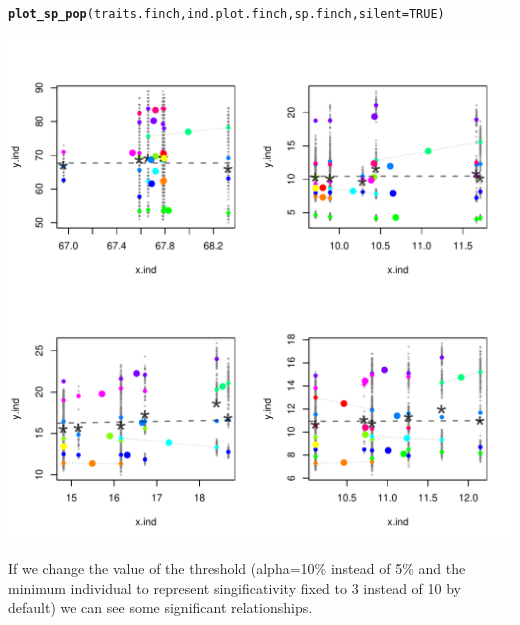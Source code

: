 \documentclass[12pt]{article}\usepackage[]{graphicx}\usepackage[]{color}
\makeatletter
\def\maxwidth{ %
  \ifdim\Gin@nat@width>\linewidth
    \linewidth
  \else
    \Gin@nat@width
  \fi
}
\newcommand{\hlnum}[1]{\textcolor[rgb]{0.686,0.059,0.569}{#1}}%
\newcommand{\hlstd}[1]{\textcolor[rgb]{0.345,0.345,0.345}{#1}}%
\newcommand{\hlkwc}[1]{\textcolor[rgb]{0.333,0.667,0.333}{#1}}%
\newcommand{\hlkwd}[1]{\textcolor[rgb]{0.737,0.353,0.396}{\textbf{#1}}}%
\newenvironment{kframe}{%
 \def\at@end@of@kframe{}%
 \ifinner\ifhmode%
  \def\at@end@of@kframe{\end{minipage}}%
  \begin{minipage}{\columnwidth}%
 \fi\fi%
 \def\FrameCommand##1{\hskip\@totalleftmargin \hskip-\fboxsep
 \colorbox{shadecolor}{##1}\hskip-\fboxsep
     \hskip-\linewidth \hskip-\@totalleftmargin \hskip\columnwidth}%
 \MakeFramed {\advance\hsize-\width
   \@totalleftmargin\z@ \linewidth\hsize
   \@setminipage}}%
 {\par\unskip\endMakeFramed%
 \at@end@of@kframe}
\newenvironment{knitrout}{}{} %
\makeatother
\begin{document}
\begin{knitrout}
\color{fgcolor}\begin{kframe}
\begin{alltt}
\hlkwd{plot_sp_pop}\hlstd{(traits.finch, ind.plot.finch, sp.finch,} \hlkwc{silent} \hlstd{=} \hlnum{TRUE}\hlstd{)}
\end{alltt}
\end{kframe}
\includegraphics[width=\maxwidth]{figure/unnamed-chunk-17} 

\end{knitrout}


If we change the value of the threshold (alpha=10\% instead of 5\% and the minimum individual to represent singificativity fixed to 3 instead of 10 by default) we can see some significant relationships.

\newpage
\end{document}
